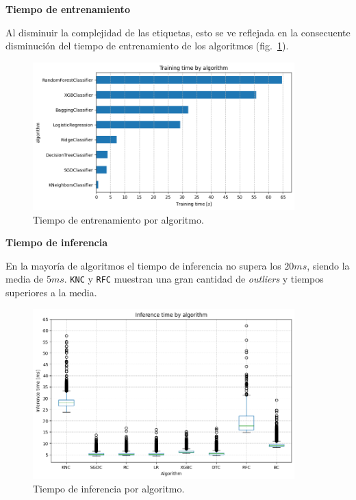 \documentclass[a4paper,12pt]{article}
\begin{document}
		\textbf{Tiempo de entrenamiento}
						
		Al disminuir la complejidad de las etiquetas, esto se ve reflejada en la consecuente disminución del tiempo de entrenamiento de los algoritmos (fig.~\ref{fig:training_time_uet}).
						
		\begin{figure}[H]
			\begin{center}
				\includegraphics[width=0.9\textwidth]{training_time_uet.png}
				\caption{Tiempo de entrenamiento por algoritmo.}
				\label{fig:training_time_uet}
			\end{center}
		\end{figure}
						
		\textbf{Tiempo de inferencia}
						
		En la mayoría de algoritmos el tiempo de inferencia no supera los $20ms$, siendo la media de $5ms$. \texttt{KNC} y \texttt{RFC} muestran una gran cantidad de \textit{outliers} y tiempos superiores a la media.
						
		\begin{figure}[H]
			\begin{center}
				\includegraphics[width=0.9\textwidth]{inference_time_uet.png}
				\caption{Tiempo de inferencia por algoritmo.}
				\label{fig:inference_time_uet}
			\end{center}
		\end{figure}
						
\end{document}
